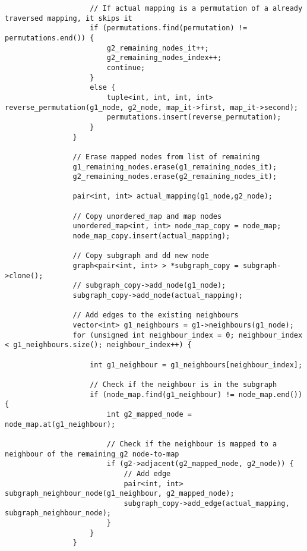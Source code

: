 \begin{lstlisting}
                    // If actual mapping is a permutation of a already traversed mapping, it skips it
                    if (permutations.find(permutation) != permutations.end()) {
                        g2_remaining_nodes_it++;
                        g2_remaining_nodes_index++;
                        continue;
                    }
                    else {
                        tuple<int, int, int, int> reverse_permutation(g1_node, g2_node, map_it->first, map_it->second);
                        permutations.insert(reverse_permutation);
                    }
                }

                // Erase mapped nodes from list of remaining
                g1_remaining_nodes.erase(g1_remaining_nodes_it);
                g2_remaining_nodes.erase(g2_remaining_nodes_it);

                pair<int, int> actual_mapping(g1_node,g2_node);

                // Copy unordered_map and map nodes
                unordered_map<int, int> node_map_copy = node_map;
                node_map_copy.insert(actual_mapping);

                // Copy subgraph and dd new node
                graph<pair<int, int> > *subgraph_copy = subgraph->clone();
                // subgraph_copy->add_node(g1_node);
                subgraph_copy->add_node(actual_mapping);

                // Add edges to the existing neighbours
                vector<int> g1_neighbours = g1->neighbours(g1_node);
                for (unsigned int neighbour_index = 0; neighbour_index < g1_neighbours.size(); neighbour_index++) {

                    int g1_neighbour = g1_neighbours[neighbour_index];

                    // Check if the neighbour is in the subgraph
                    if (node_map.find(g1_neighbour) != node_map.end()) {
                        int g2_mapped_node = node_map.at(g1_neighbour);

                        // Check if the neighbour is mapped to a neighbour of the remaining_g2 node-to-map
                        if (g2->adjacent(g2_mapped_node, g2_node)) {
                            // Add edge
                            pair<int, int> subgraph_neighbour_node(g1_neighbour, g2_mapped_node);
                            subgraph_copy->add_edge(actual_mapping, subgraph_neighbour_node);
                        }
                    }
                }


\end{lstlisting}
